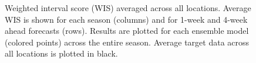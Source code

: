 \documentclass[
  article,
  shortnames,
  notitle]{jss}
\begin{document}
\begin{figure}


\caption{\label{fig-wis-vs-forecast-date}Weighted interval score (WIS)
averaged across all locations. Average WIS is shown for each season
(columns) and for 1-week and 4-week ahead forecasts (rows). Results are
plotted for each ensemble model (colored points) across the entire
season. Average target data across all locations is plotted in black.}

\end{figure}%
\end{document}
